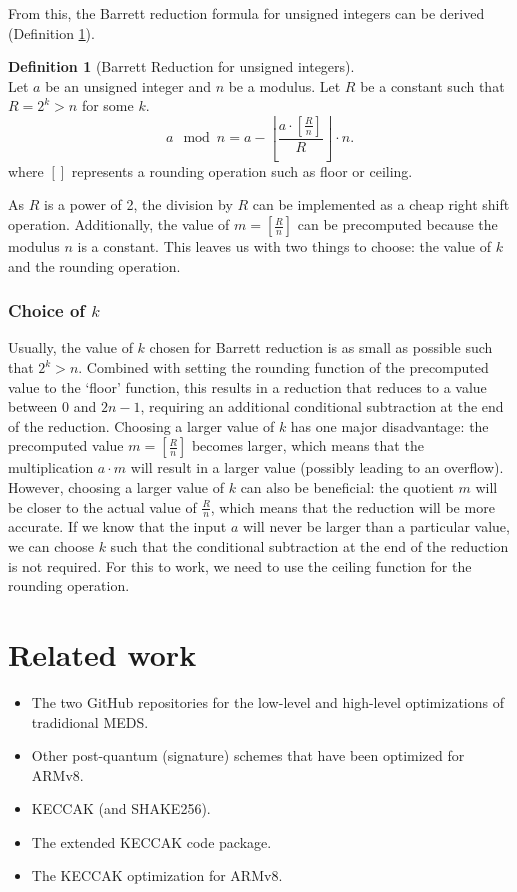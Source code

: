 \documentclass[11pt,a4paper]{report}
\theoremstyle{definition}
\newtheorem{definition}{Definition}[section]
\begin{document}
From this, the Barrett reduction formula for unsigned integers can be derived (Definition \ref{def:barrettreduction}).

\begin{definition}[Barrett Reduction for unsigned integers]~\\
  \label{def:barrettreduction}
  Let $a$ be an unsigned integer and $n$ be a modulus.
  Let $R$ be a constant such that $R = 2^k > n$ for some $k$.
  \[
    a \mod n = a - \left\lfloor \frac{a \cdot \left[\frac{R}{n}\right]}{R} \right\rfloor \cdot n.
  \]
  where $\left[\right]$ represents a rounding operation such as floor or ceiling.
\end{definition}

As $R$ is a power of 2, the division by $R$ can be implemented as a cheap right shift operation. Additionally, the value of $m = \left[\frac{R}{n}\right]$ can be precomputed because the modulus $n$ is a constant. This leaves us with two things to choose: the value of $k$ and the rounding operation.

\subsubsection{Choice of $k$}
\label{sec:choiceofk}
Usually, the value of $k$ chosen for Barrett reduction is as small as possible such that $2^k > n$. Combined with setting the rounding function of the precomputed value to the `floor' function, this results in a reduction that reduces to a value between $0$ and $2n-1$, requiring an additional conditional subtraction at the end of the reduction. Choosing a larger value of $k$ has one major disadvantage: the precomputed value $m = \left[\frac{R}{n}\right]$ becomes larger, which means that the multiplication $a \cdot m$ will result in a larger value (possibly leading to an overflow). However, choosing a larger value of $k$ can also be beneficial: the quotient $m$ will be closer to the actual value of $\frac{R}{n}$, which means that the reduction will be more accurate. If we know that the input $a$ will never be larger than a particular value, we can choose $k$ such that the conditional subtraction at the end of the reduction is not required. For this to work, we need to use the ceiling function for the rounding operation.

\section{Related work}
\begin{itemize}
  \item The two GitHub repositories for the low-level and high-level optimizations of tradidional MEDS.
  \item Other post-quantum (signature) schemes that have been optimized for ARMv8.
  \item KECCAK (and SHAKE256).
  \item The extended KECCAK code package.
  \item The KECCAK optimization for ARMv8.
\end{itemize}
\end{document}
